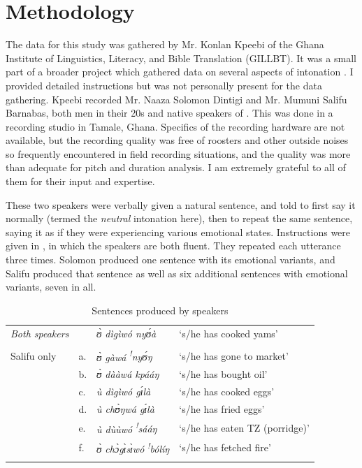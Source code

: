 \documentclass[output=paper]{langsci/langscibook}
\begin{document}
\section{Methodology}
The data for this study was gathered by Mr. Konlan Kpeebi of the Ghana Institute of Linguistics, Literacy, and Bible Translation (GILLBT). It was a small part of a broader project which gathered data on several aspects of  intonation \citep{cahill2016intonation}. I provided detailed instructions but was not personally present for the data gathering. Kpeebi recorded Mr. Naaza Solomon Dintigi and Mr. Mumuni Salifu Barnabas, both men in their 20s and native speakers of . This was done in a recording studio in Tamale, Ghana. Specifics of the recording hardware are not available, but the recording quality was free of roosters and other outside noises so frequently encountered in field recording situations, and the quality was more than adequate for pitch and duration analysis. I am extremely grateful to all of them for their input and expertise.


These two  speakers were verbally given a natural  sentence, and told to first say it normally (termed the \emph{neutral} intonation here), then to repeat the same sentence, saying it as if they were experiencing various emotional states. Instructions were given in , in which the speakers are both fluent. They repeated each utterance three times. Solomon produced one sentence with its emotional variants, and Salifu produced that sentence as well as six additional sentences with emotional variants, seven in all.


\begin{table}
\begin{tabular}{llll}
\lsptoprule

\emph{\textup{Both speakers}} & & \textit{ʊ̀ dìgìwó nyʊ́à} & `s/he has cooked yams'\\ & & & \\
Salifu only & a. & \textit{ʊ̀ gàwá} \textit{\textsuperscript{!}}\textit{nyʊ́ŋ} & `s/he has gone to market'\\
& b. & \textit{ʊ̀ dààwá kpááŋ} & `s/he has bought oil'\\
& c. & \textit{ù dìgìwó gɪ́là} & `s/he has cooked eggs'\\
& d. & \textit{ù chʊ̀ŋwá gɪ́là} & `s/he has fried eggs'\\
& e. & \textit{ù dùùwó} \textit{\textsuperscript{!}}\textit{sááŋ} & `s/he has eaten TZ (porridge)'\\
& f. & \textit{ʊ̀ chɔ̀gɪ̀sɪ̀wó} \textit{\textsuperscript{!}}\textit{bólíŋ} & `s/he has fetched fire'  \\
\lspbottomrule
\end{tabular}

\caption{Sentences produced by speakers}
\label{tab:2.cahill}

\end{table}
\end{document}
